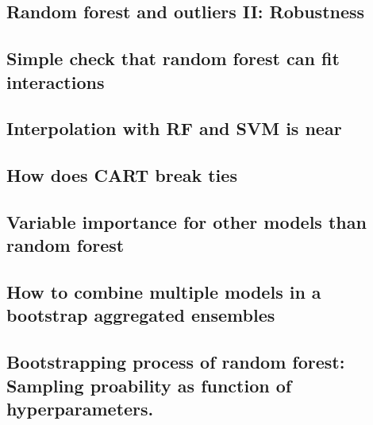 \subsection{Random forest and outliers II: Robustness}


\subsection{Simple check that random forest can fit interactions}


\subsection{Interpolation with RF and SVM is near}


\subsection{How does CART break ties}


\subsection{Variable importance for other models than random forest}


\subsection{How to combine multiple models in a bootstrap aggregated ensembles}


\subsection{Bootstrapping process of random forest: Sampling proability as function of hyperparameters.}


